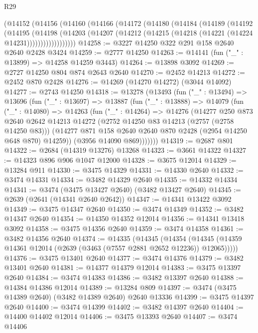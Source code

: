\begin{lexlean}{R29}
\begin{coremodule}
    (@14152
      (@14156
        (@14160
          (@14166
            (@14172
              (@14180
                (@14184
                  (@14189
                    (@14192
                      (@14195
                        (@14198
                          (@14203
                            (@14207 (@14212 (@14215 (@14218 (@14221 (@14224 @14231))))))))))))))))))
@14258 := @3227 @14250 @322 @291 @158 @2640 @2640 @2428 @3424
@14259 := @2777 @14250
@14263 := @14141 (fun ("_" : @13899) => @14258 @14259 @3443)
@14264 := @13898 @3092
@14269 := @2727 @14250 @804 @874 @2643 @2640
@14270 := @2452 @14213
@14272 := @2452 @870 @2428
@14276 := @14269 (@14270 @14272) (@3044 @14092)
@14277 := @2743 @14250
@14318 := @13278
    (@13493
      (fun ("_" : @13494) =>
      @13696
        (fun ("_" : @13697) =>
        @13887
          (fun ("_" : @13888) =>
          @14079
            (fun ("_" : @14080) =>
            @14263
              (fun ("_" : @14264) =>
              @14276
                (@14277
                  @250
                  @873
                  @2640
                  @2642
                  @14213
                  @14272
                  (@2752 @14250 @83 @14213 (@2757 (@2758 @14250 @83)))
                  (@14277 @871 @158 @2640 @2640 @870 @2428 (@2954 @14250 @648 @870) @14259))
                (@3956 @14090 @869)))))))
@14319 := @2687 @801
@14322 := @2684 (@14319 @13276) @13268
@14323 := @3661 @14322
@14327 := @14323 @896 @906 @1047 @12000
@14328 := @3675 @12014
@14329 := @13284 @911
@14330 := @3475 @14329
@14331 := @14330 @2640
@14332 := @3474 @14331
@14334 := @3482 @14329 @2640
@14335 := @14332 @14334
@14341 := @3474 (@3475 @13427 @2640) (@3482 @13427 @2640)
@14345 := @2639 (@2641 (@14341 @2640 @2642))
@14347 := @14341 @13422 @3092
@14349 := @3475 @14347 @2640
@14350 := @3474 @14349
@14352 := @3482 @14347 @2640
@14354 := @14350 @14352 @12014
@14356 := @14341 @13418 @3092
@14358 := @3475 @14356 @2640
@14359 := @3474 @14358
@14361 := @3482 @14356 @2640
@14374 := @14335
    (@14345
      (@14354 (@14345 (@14359 @14361 @12014 (@2639 (@3463 (@7557 @2881 @2652 @12236)) @12065)))))
@14376 := @3475 @13401 @2640
@14377 := @3474 @14376
@14379 := @3482 @13401 @2640
@14381 := @14377 @14379 @12014
@14383 := @3475 @13397 @2640
@14384 := @3474 @14383
@14386 := @3482 @13397 @2640
@14388 := @14384 @14386 @12014
@14389 := @13284 @809
@14397 := @3474 (@3475 @14389 @2640) (@3482 @14389 @2640) @2640 @13336
@14399 := @3475 @14397 @2640
@14400 := @3474 @14399
@14402 := @3482 @14397 @2640
@14404 := @14400 @14402 @12014
@14406 := @3475 @13393 @2640
@14407 := @3474 @14406

\end{coremodule}
\end{lexlean}
